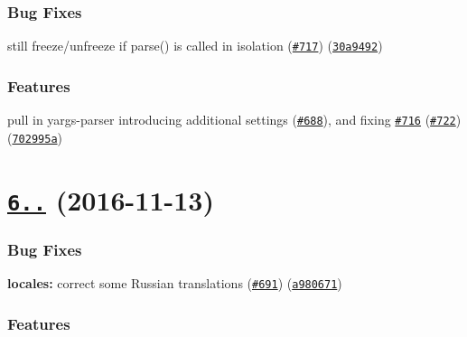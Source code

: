 \subsubsection*{Bug Fixes}


\begin{DoxyItemize}
\item still freeze/unfreeze if parse() is called in isolation (\href{https://github.com/yargs/yargs/issues/717}{\tt \#717}) (\href{https://github.com/yargs/yargs/commit/30a9492}{\tt 30a9492})
\end{DoxyItemize}

\subsubsection*{Features}


\begin{DoxyItemize}
\item pull in yargs-\/parser introducing additional settings (\href{https://github.com/yargs/yargs/issues/688}{\tt \#688}), and fixing \href{https://github.com/yargs/yargs/issues/716}{\tt \#716} (\href{https://github.com/yargs/yargs/issues/722}{\tt \#722}) (\href{https://github.com/yargs/yargs/commit/702995a}{\tt 702995a})
\end{DoxyItemize}

\label{_6.4.0}%
 \section*{\href{https://github.com/yargs/yargs/compare/v6.3.0...v6.4.0}{\tt 6..} (2016-\/11-\/13)}

\subsubsection*{Bug Fixes}


\begin{DoxyItemize}
\item {\bfseries locales\+:} correct some Russian translations (\href{https://github.com/yargs/yargs/issues/691}{\tt \#691}) (\href{https://github.com/yargs/yargs/commit/a980671}{\tt a980671})
\end{DoxyItemize}

\subsubsection*{Features}


